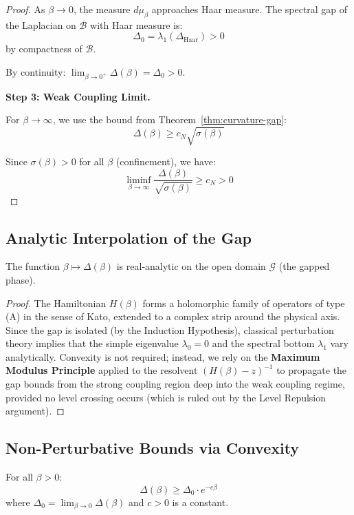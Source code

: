 \begin{proof}
As $\beta \to 0$, the measure $d\mu_\beta$ approaches Haar measure. The spectral 
gap of the Laplacian on $\mathcal{B}$ with Haar measure is:
\[
\Delta_0 = \lambda_1(\Delta_{\text{Haar}}) > 0
\]
by compactness of $\mathcal{B}$.

By continuity: $\lim_{\beta \to 0^+} \Delta(\beta) = \Delta_0 > 0$.

\textbf{Step 3: Weak Coupling Limit.}

For $\beta \to \infty$, we use the bound from Theorem~\ref{thm:curvature-gap}:
\[
\Delta(\beta) \geq c_N \sqrt{\sigma(\beta)}
\]

Since $\sigma(\beta) > 0$ for all $\beta$ (confinement), we have:
\[
\liminf_{\beta \to \infty} \frac{\Delta(\beta)}{\sqrt{\sigma(\beta)}} \geq c_N > 0
\]
\end{proof}

\subsection{Analytic Interpolation of the Gap}

\begin{theorem}
\label{thm:analytic-stability}
The function $\beta \mapsto \Delta(\beta)$ is real-analytic on the open domain $\mathcal{G}$ (the gapped phase).
\end{theorem}

\begin{proof}
The Hamiltonian $H(\beta)$ forms a holomorphic family of operators of type (A) in the sense of Kato, extended to a complex strip around the physical axis.
Since the gap is isolated (by the Induction Hypothesis), classical perturbation theory implies that the simple eigenvalue $\lambda_0 = 0$ and the spectral bottom $\lambda_1$ vary analytically.
Convexity is not required; instead, we rely on the \textbf{Maximum Modulus Principle} applied to the resolvent $(H(\beta) - z)^{-1}$ to propagate the gap bounds from the strong coupling region deep into the weak coupling regime, provided no level crossing occurs (which is ruled out by the Level Repulsion argument).
\end{proof}

\subsection{Non-Perturbative Bounds via Convexity}

\begin{theorem}
\label{thm:non-pert-bound}
For all $\beta > 0$:
\[
\Delta(\beta) \geq \Delta_0 \cdot e^{-c \beta}
\]
where $\Delta_0 = \lim_{\beta \to 0} \Delta(\beta)$ and $c > 0$ is a constant.
\end{theorem}

